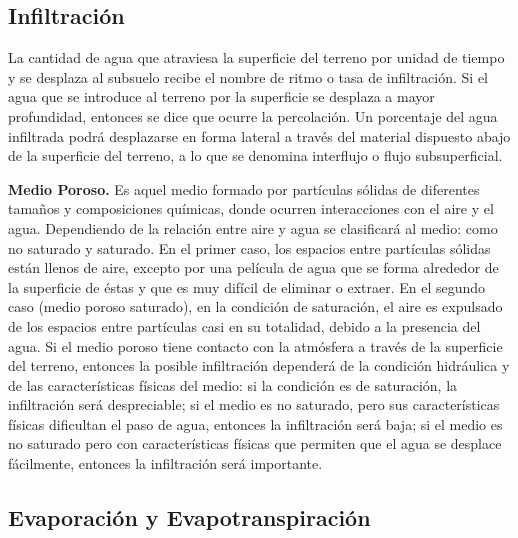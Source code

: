 \documentclass[10pt,a4paper, twoside]{report}
\begin{document}
\subsection{Infiltración}
\label{subsec:infiltracion}

La cantidad de agua que atraviesa la superficie del terreno por unidad de tiempo y se desplaza al subsuelo recibe el nombre de ritmo o tasa de infiltración. Si el agua que se introduce al terreno por la superficie se 
desplaza a mayor profundidad, entonces se dice que ocurre la percolación. Un porcentaje del agua infiltrada podrá desplazarse en forma lateral a través del material dispuesto abajo de la superficie del terreno, a lo que se denomina interflujo o flujo subsuperficial. 

\textbf{Medio Poroso.} Es aquel medio formado por partículas sólidas de diferentes tamaños y composiciones químicas, donde ocurren interacciones con el aire y el agua. Dependiendo de la relación entre aire y agua se clasificará al medio: como no saturado y saturado. En el primer caso, los espacios entre partículas sólidas están llenos de aire, excepto por una película de agua que se forma alrededor de la superficie de éstas y que es muy difícil de eliminar o extraer. En el segundo caso (medio poroso saturado), en la condición de saturación, el aire es expulsado de los espacios entre partículas casi en su totalidad, debido a la presencia del agua. 
Si el medio poroso tiene contacto con la atmósfera a través de la superficie del terreno, entonces la posible infiltración dependerá de la condición hidráulica y de las características físicas del medio: si la condición es de saturación, la infiltración será despreciable; si el medio es no saturado, pero sus características físicas dificultan el paso de agua, entonces la infiltración será baja; si el medio es no saturado pero con características físicas que permiten que el agua se desplace fácilmente, entonces la infiltración será importante. 


\subsection{Evaporación y Evapotranspiración}
\label{subsec:evapYevapotrans}
\end{document}
